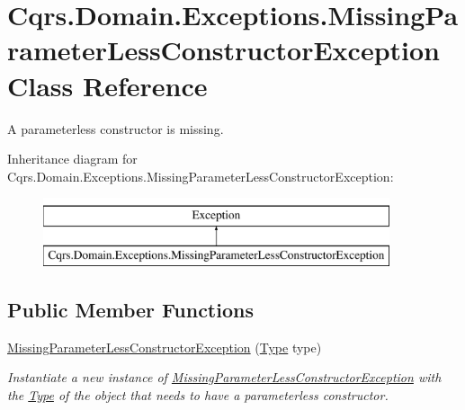 \hypertarget{classCqrs_1_1Domain_1_1Exceptions_1_1MissingParameterLessConstructorException}{}\section{Cqrs.\+Domain.\+Exceptions.\+Missing\+Parameter\+Less\+Constructor\+Exception Class Reference}
\label{classCqrs_1_1Domain_1_1Exceptions_1_1MissingParameterLessConstructorException}


A parameterless constructor is missing.  


Inheritance diagram for Cqrs.\+Domain.\+Exceptions.\+Missing\+Parameter\+Less\+Constructor\+Exception\+:\begin{figure}[H]
\begin{center}
\leavevmode
\includegraphics[height=2.000000cm]{classCqrs_1_1Domain_1_1Exceptions_1_1MissingParameterLessConstructorException}
\end{center}
\end{figure}
\subsection*{Public Member Functions}
\begin{DoxyCompactItemize}
\item 
\hyperlink{classCqrs_1_1Domain_1_1Exceptions_1_1MissingParameterLessConstructorException_a5de10c873bab008d2527ff96fdf5f6b2_a5de10c873bab008d2527ff96fdf5f6b2}{Missing\+Parameter\+Less\+Constructor\+Exception} (\hyperlink{classCqrs_1_1Domain_1_1Exceptions_1_1MissingParameterLessConstructorException_a9350872fe9744fbd82af49b2e663ccc0_a9350872fe9744fbd82af49b2e663ccc0}{Type} type)
\begin{DoxyCompactList}\small\item\em Instantiate a new instance of \hyperlink{classCqrs_1_1Domain_1_1Exceptions_1_1MissingParameterLessConstructorException}{Missing\+Parameter\+Less\+Constructor\+Exception} with the \hyperlink{classCqrs_1_1Domain_1_1Exceptions_1_1MissingParameterLessConstructorException_a9350872fe9744fbd82af49b2e663ccc0_a9350872fe9744fbd82af49b2e663ccc0}{Type} of the object that needs to have a parameterless constructor. \end{DoxyCompactList}\end{DoxyCompactItemize}
